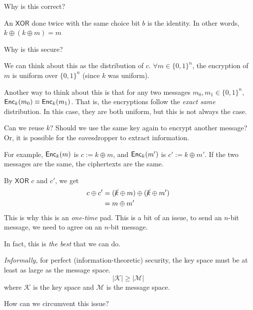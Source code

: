 \begin{ques*}
    Why is this correct?
\end{ques*}
An $\mathsf{XOR}$ done twice with the same choice bit $b$ is the identity. In other words, $k\oplus ( k\oplus m ) = m$
\begin{ques*}
    Why is this secure?
\end{ques*}

We can think about this as the distribution of $c$. $\forall m\in \{0, 1\}^n$, the encryption of $m$ is uniform over $\{0, 1\}^n$ (since $k$ was uniform).

Another way to think about this is that for any two messages $m_0, m_1\in\{0, 1\}^n$, $\operatorname{\mathsf{Enc}}_k(m_0)\equiv \operatorname{\mathsf{Enc}}_k(m_1)$. That is, the encryptions follow the \emph{exact same} distribution. In this case, they are both uniform, but this is not always the case.

\begin{ques*}
    Can we reuse $k$? Should we use the same key again to encrypt another message? Or, it is possible for the eavesdropper to extract information.
\end{ques*}

For example, $\operatorname{\mathsf{Enc}}_k(m)$ is $c:= k\oplus m$, and $\operatorname{\mathsf{Enc}}_k(m')$ is $c' := k\oplus m'$. If the two messages are the same, the ciphertexts are the same.

By $\mathsf{XOR}$ $c$ and $c'$, we get
\begin{align*}
    c\oplus c' & = (\cancel{k}\oplus m) \oplus (\cancel{k}\oplus m') \\
               & = m\oplus m'
\end{align*}
This is why this is an \emph{one-time} pad. This is a bit of an issue, to send an $n$-bit message, we need to agree on an $n$-bit message.

In fact, this is \emph{the best} that we can do.

\begin{theorem}
    \emph{Informally,} for perfect (information-theoretic) security, the key space must be at least as large as the message space.
    \[|\mathcal{K}|\geq |\mathcal{M}|\]
    where $\mathcal{K}$ is the key space and $\mathcal{M}$ is the message space.
\end{theorem}

\begin{ques*}
    How can we circumvent this issue?
\end{ques*}

